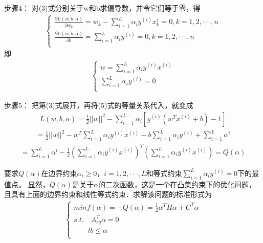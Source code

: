 \documentclass[12pt,a4paper]{article}%
\begin{document}
	步骤4：
	对(3)式分别关于w和b求偏导数，并令它们等于零，得
	\begin{align}
		\begin{cases} \frac{\partial{L(w,b,\alpha)}}{\partial{w}_{k}}={w}_{k}-\sum_{i=1}^{L}  {\alpha _{i}{y}^{(i)}{x}_k^{i}=0,k=1,2,···,n}\\ \frac{\partial{L(w,b,\alpha)}}{\partial{b}}=\sum_{i=1}^{L}{{\alpha }_{i}{y}^{(i)}=0,k=1,2,···,n} \\ \end{cases} 
	\end{align}
	即
	\begin{align}
		\begin{cases} w=\sum_{i=1}^{L} {\alpha }_{i}{y}^{(i)}{x}^{(i)}\\ \sum_{i=1}^{L} {\alpha_{i}{y}^{(i)}=0}\\ \end{cases} 
	\end{align}
	
	步骤5：
	把第(3)式展开，再将(5)式的等量关系代入，就变成
	\begin{align}
		L(w,b,\alpha)=\frac{1}{2}{||w||}^{2}-\sum_{i=1}^{L} {\alpha}_{i}\left[{y}^{(i)}{({w}^{T}{x}^{(i)}+b)}-1\right]
	\end{align}
	\begin{align}
		=\frac{1}{2}{||w||}^{2}-{w}^{T}\sum_{i=1}^{L} {\alpha }_{i}{y}^{(i)}{x}^{(i)}-b\sum_{i=1}^{L} {\alpha }_{i}{y}^{(i)}+\sum_{i=1}^{L} {\alpha}^{i}
	\end{align}
	\begin{align}
		=\sum_{i=1}^{L} {\alpha}^{i}-\frac{1}{2}{\left(\sum_{i=1}^{L} {\alpha }_{i}{y}^{(i)}{x}^{(i)} \right)}^{T}\left(\sum_{i=1}^{L} {\alpha }_{i}{y}^{(i)}{x}^{(i)} \right)=Q(\alpha)
	\end{align}
	
	要求$Q(\alpha)$在边界约束${\alpha}_{i}\geq0$，$i=1,2,···,L$和等式约束$\sum_{i=1}^{L} {\alpha }_{i}{y}^{(i)}=0$下的最值点。
	显然，$Q(\alpha)$是关于$\alpha$的二次函数，这是一个在凸集约束下的优化问题，且具有上面的边界约束和线性等式约束．求解该问题的标准形式为
	\begin{align}
		\begin{cases} min f(\alpha)=-Q(\alpha)=\frac{1}{2}{\alpha}^{T}H{\alpha}+{C}^{T}\alpha    \\ s.t.\quad	{A}_{eq}^{T}\alpha=0\\
			{	\qquad	} lb\leq\alpha \\ \end{cases} 
	\end{align}
	
\end{document}
